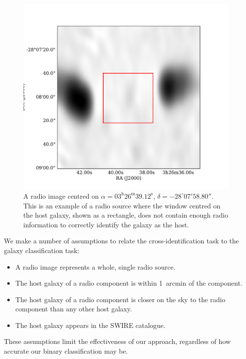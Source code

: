 \documentclass[fleqn,usenatbib,usedcolumn]{mnras}
\begin{document}
        \begin{figure}
      \centering
      \includegraphics[width=\linewidth]{images/CI2363_fig.pdf}
      \caption{A radio image centred on $\alpha =
        03^\text{h}26^\text{m}39.12^\text{s}$, $\delta = -28^\circ{}07'58.80''$.        %
        This is an example of a radio source where the window centred on the
        host galaxy, shown as a rectangle, does not contain enough radio
        information to correctly identify the galaxy as the host.}
      \label{fig:broken-window-size}
    \end{figure}

    We make a number of assumptions to relate the cross-identification task to
    the galaxy classification task:
    \begin{itemize}
      \item A radio image represents a whole, single radio source.
      \item The host galaxy of a radio component is within 1~arcmin of the
        component.
      \item The host galaxy of a radio component is closer on the sky to the
        radio component than any other host galaxy.
      \item The host galaxy appears in the SWIRE catalogue.
    \end{itemize}
    These assumptions limit the effectiveness of our approach, regardless of
    how accurate our binary classification may be.
\end{document}
